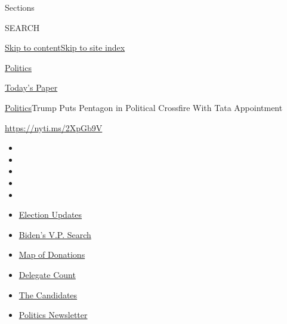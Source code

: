 Sections

SEARCH

\protect\hyperlink{site-content}{Skip to
content}\protect\hyperlink{site-index}{Skip to site index}

\href{https://www.nytimes.com/section/politics}{Politics}

\href{https://myaccount.nytimes.com/auth/login?response_type=cookie\&client_id=vi}{}

\href{https://www.nytimes.com/section/todayspaper}{Today's Paper}

\href{/section/politics}{Politics}\textbar{}Trump Puts Pentagon in
Political Crossfire With Tata Appointment

\url{https://nyti.ms/2XpGb9V}

\begin{itemize}
\item
\item
\item
\item
\item
\end{itemize}

\begin{itemize}
\item
  \href{https://www.nytimes.com/2020/08/03/us/elections/biden-vs-trump.html?action=click\&pgtype=Article\&state=default\&region=TOP_BANNER\&context=storylines_menu}{Election
  Updates}
\item
  \href{https://www.nytimes.com/article/biden-vice-president-2020.html?action=click\&pgtype=Article\&state=default\&region=TOP_BANNER\&context=storylines_menu}{Biden's
  V.P. Search}
\item
  \href{https://www.nytimes.com/interactive/2020/07/24/us/politics/trump-biden-campaign-donors.html?action=click\&pgtype=Article\&state=default\&region=TOP_BANNER\&context=storylines_menu}{Map
  of Donations}
\item
  \href{https://www.nytimes.com/interactive/2020/us/elections/delegate-count-primary-results.html?action=click\&pgtype=Article\&state=default\&region=TOP_BANNER\&context=storylines_menu}{Delegate
  Count}
\item
  \href{https://www.nytimes.com/interactive/2019/us/politics/2020-presidential-candidates.html?action=click\&pgtype=Article\&state=default\&region=TOP_BANNER\&context=storylines_menu}{The
  Candidates}
\item
  \href{https://www.nytimes.com/newsletters/politics?action=click\&pgtype=Article\&state=default\&region=TOP_BANNER\&context=storylines_menu}{Politics
  Newsletter}
\end{itemize}

